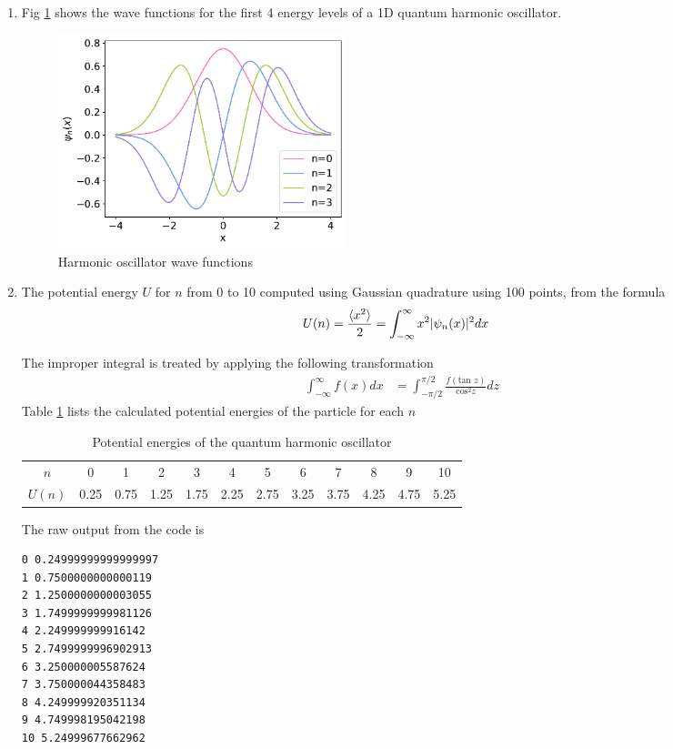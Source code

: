 \documentclass{article}
\begin{document}
\begin{enumerate}
\begin{enumerate}
    \item Fig \ref{fig:3b} shows the wave functions for the first 4 energy levels of a 1D quantum harmonic oscillator.
    \begin{figure}[H]
        \centering 
        \includegraphics[width=0.42\textwidth]{Q3b.pdf}
        \caption{Harmonic oscillator wave functions}
        \label{fig:3b}
      \end{figure}

    \item The potential energy $U$ for $n$ from 0 to 10 computed using Gaussian quadrature using 100 points, from the formula 
    \begin{align*}
        U(n) &= \frac{\braket{x^2}}{2} = \int_{-\infty}^{\infty}x^2|\psi_n(x)|^2 dx
    \end{align*}

    The improper integral is treated by applying the following transformation
    \begin{align*}
        \int_{-\infty}^{\infty} f(x) dx &= \int_{-\pi/2}^{\pi/2} \frac{f(\text{tan }z)}{\text{cos}^2 z} dz
    \end{align*}
    Table \ref{tab:3c} lists the calculated potential energies of the particle for each $n$
    \begin{table}[h]
        \centering
        \begin{tabular}{c|c c c c c c c c c c c}
            $n$ & 0 & 1 & 2 & 3 & 4 & 5 & 6 & 7 & 8 & 9 & 10 \\
            $U(n)$ & 0.25 & 0.75 & 1.25 & 1.75 & 2.25 & 2.75 & 3.25 & 3.75 & 4.25 & 4.75 & 5.25
        \end{tabular}
        \caption{Potential energies of the quantum harmonic oscillator}
        \label{tab:3c}
    \end{table}

    The raw output from the code is 
\begin{verbatim}
0 0.24999999999999997
1 0.7500000000000119
2 1.2500000000003055
3 1.7499999999981126
4 2.249999999916142
5 2.7499999996902913
6 3.250000005587624
7 3.750000044358483
8 4.249999920351134
9 4.749998195042198
10 5.24999677662962
\end{verbatim}
\end{enumerate}

\end{enumerate}
\end{document}
